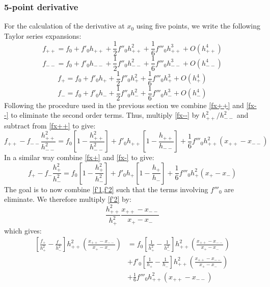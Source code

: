\subsubsection{5-point derivative}
For the calculation of the derivative at $x_0$ using five points, we write the following Taylor series expansions:
\begin{equation}
f_{++} = f_0 + f'_0 h_{++} + \frac{1}{2}f''_0 h_{++}^2 + \frac{1}{6}f'''_0 h_{++}^3 + O(h_{++}^4)
\label{fx++}
\end{equation}
\begin{equation}
f_{--} = f_0 + f'_0 h_{--} + \frac{1}{2}f''_0 h_{--}^2 + \frac{1}{6}f'''_0 h_{--}^3 + O(h_{--}^4)
\label{fx--}
\end{equation}
\begin{equation}
f_{+} = f_0 + f'_0 h_+ + \frac{1}{2}f''_0 h_{+}^2 + \frac{1}{6}f'''_0 h_{+}^3 + O(h_{+}^4)
\label{fx+}
\end{equation}
\begin{equation}
f_{-} = f_0 + f'_0 h_- + \frac{1}{2}f''_0 h_{-}^2 + \frac{1}{6}f'''_0 h_{-}^3 + O(h_{-}^4)
\label{fx-}
\end{equation}
Following the procedure used in the previous section we combine \cref{fx++} and \cref{fx--} to eliminate the second order terms. Thus, multiply \cref{fx--} by $h_{++}^2/h_{--}^2$ and subtract from \cref{fx++} to give:
\begin{equation}
f_{++} - f_{--}\frac{h_{++}^2}{h_{--}^2} = f_0\left[ 1 - \frac{h_{++}^2}{h_{--}^2}\right] + f'_0 h_{++} \left[ 1 - \frac{h_{++}}{h_{--}} \right] + \frac{1}{6} f'''_0 h_{++}^2 \left( x_{++} - x_{--}\right)
\label{f'1}
\end{equation}
In a similar way combine \cref{fx+} and \cref{fx-} to give:
\begin{equation}
f_+ - f_-\frac{h_+^2}{h_-^2} = f_0\left[ 1 - \frac{h_+^2}{h_-^2}\right] + f'_0 h_+ \left[ 1 - \frac{h_+}{h_-} \right] + \frac{1}{6} f'''_0 h_+^2 \left( x_+ - x_-\right)
\label{f'2}
\end{equation}
The goal is to now combine \cref{f'1,f'2} such that the terms involving $f'''_0$ are eliminate. We therefore multiply \cref{f'2} by:
\begin{equation}
\frac{h_{++}^2}{h_+^2}\frac{x_{++}-x_{--}}{x_+-x_-}
\end{equation}
which gives:
\begin{equation}
\begin{split}
\left[ \frac{f_+}{h_+^2} - \frac{f_-}{h_-^2} \right] h_{++}^2 \left(\frac{x_{++} - x_{--}}{x_+ - x_-}\right) &= f_0 \left[\frac{1}{h_+^2} - \frac{1}{h_-^2} \right] h_{++}^2 \left(\frac{x_{++} - x_{--}}{x_+ - x_-}\right) \\&+  f'_0 \left[ \frac{1}{h_+} - \frac{1}{h_-} \right] h_{++}^2 \left(\frac{x_{++} - x_{--}}{x_+ - x_-}\right) \\&+ \frac{1}{6} f'''_0 h_{++}^2 \left( x_{++} - x_{--} \right)
\end{split}
\label{f'2a}
\end{equation}
